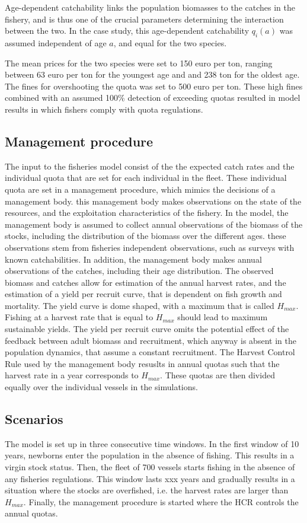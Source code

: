 \documentclass[12pt,oneline,a4paper,numbib]{ouparticle}
\numberwithin{equation}{subsection} %
\begin{document}
Age-dependent catchability links the population biomasses to the catches in the fishery, and is thus one of the crucial parameters determining the interaction between the two. In the case study, this age-dependent catchability $q_i (a)$ was assumed independent of age $a$, and equal for the two species.

The mean prices for the two species were set to 150 euro per ton, ranging between 63 euro per ton for the youngest age and and 238 ton for the oldest age. The fines for overshooting the quota was set  to 500 euro per ton. These high fines combined with an assumed 100\% detection of exceeding quotas resulted in model results in which fishers comply with quota regulations.

\subsection{Management procedure}
\label{sec2.3}
The input to the fisheries model consist of the the expected catch rates and the individual quota that are set for each individual in the fleet. These individual quota are set in a management procedure, which mimics the decisions of a management body. this management body makes observations on the state of the resources, and the exploitation characteristics of the fishery. In the model, the management body is assumed to collect annual observations of the biomass of the stocks, including the distribution of the biomass over the different ages. these observations stem from fisheries independent observations, such as surveys with known catchabilities. In addition, the management body makes annual observations of the catches, including their age distribution. The observed biomass and catches allow for estimation of the annual harvest rates, and the estimation of a yield per recruit curve, that is dependent on fish growth and mortality. The yield curve is dome shaped, with a maximum that is called $H_{max}$. Fishing at a harvest rate that is equal to $H_{max}$  should lead to maximum sustainable yields. The yield per recruit curve omits the potential effect of the feedback between adult biomass and recruitment, which anyway is absent in the population dynamics, that assume a constant recruitment. The Harvest Control Rule used by the management body resuslts in annual quotas such that the harvest rate in a year corresponds to $H_{max}$. These quotas are then divided equally over the individual vessels in the simulations.  

\subsection{Scenarios}
\label{sec2.4}
The model is set up in three consecutive time windows. In the first window of 10 years, newborns enter the population in the absence of fishing. This results in a virgin stock status. Then, the fleet of 700 vessels starts fishing in the absence of any fisheries regulations. This window lasts xxx years and gradually results in a situation where the stocks are overfished, i.e. the harvest rates are larger than $H_{max}$. Finally, the management procedure is started where the HCR controls the annual quotas.  
      
\end{document}
